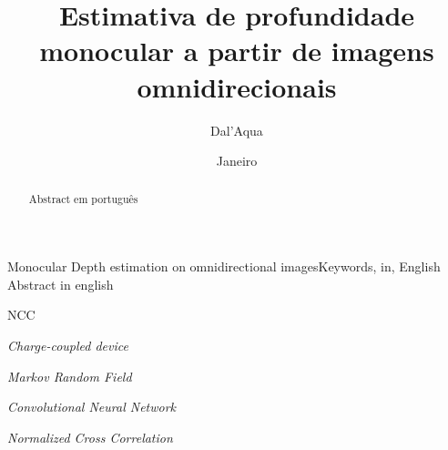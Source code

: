 \documentclass[cic,tc]{iiufrgs}
\title{Estimativa de profundidade monocular a partir de imagens omnidirecionais}
\author{Dal'Aqua}{Lorenzo Pezzi}
\date{Janeiro}{11, 2018}
\begin{document}
\maketitle





\begin{abstract}
    Abstract em português
\end{abstract}

\begin{englishabstract}{Monocular Depth estimation on omnidirectional images}{Keywords, in, English}
    Abstract in english
\end{englishabstract}

\listoffigures

\listoftables

\begin{listofabbrv}{NCC}
	\item[CCD] \textit{Charge-coupled device}
    \item[MRF] \textit{Markov Random Field}
    \item[CNN] \textit{Convolutional Neural Network}
    \item[NCC] \textit{Normalized Cross Correlation}
\end{listofabbrv}

\end{document}
